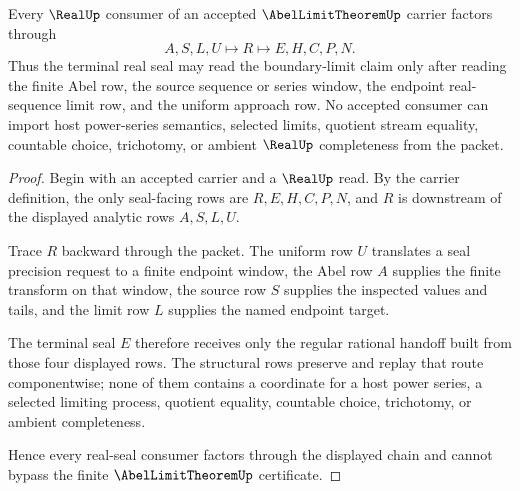 \begin{theorem}
\label{thm:abel-limit-theorem-real-seal-handoff}
Every $\RealUp$ consumer of an accepted $\AbelLimitTheoremUp$ carrier factors through
$$
A,S,L,U \longmapsto R \longmapsto E,H,C,P,N.
$$
Thus the terminal real seal may read the boundary-limit claim only after reading the finite Abel row, the source sequence or series window, the endpoint real-sequence limit row, and the uniform approach row. No accepted consumer can import host power-series semantics, selected limits, quotient stream equality, countable choice, trichotomy, or ambient $\RealUp$ completeness from the packet.
\end{theorem}
\begin{proof}
Begin with an accepted carrier and a $\RealUp$ read. By the carrier definition, the only seal-facing rows are $R,E,H,C,P,N$, and $R$ is downstream of the displayed analytic rows $A,S,L,U$.

Trace $R$ backward through the packet. The uniform row $U$ translates a seal precision request to a finite endpoint window, the Abel row $A$ supplies the finite transform on that window, the source row $S$ supplies the inspected values and tails, and the limit row $L$ supplies the named endpoint target.

The terminal seal $E$ therefore receives only the regular rational handoff built from those four displayed rows. The structural rows preserve and replay that route componentwise; none of them contains a coordinate for a host power series, a selected limiting process, quotient equality, countable choice, trichotomy, or ambient completeness.

Hence every real-seal consumer factors through the displayed chain and cannot bypass the finite $\AbelLimitTheoremUp$ certificate.
\end{proof}



